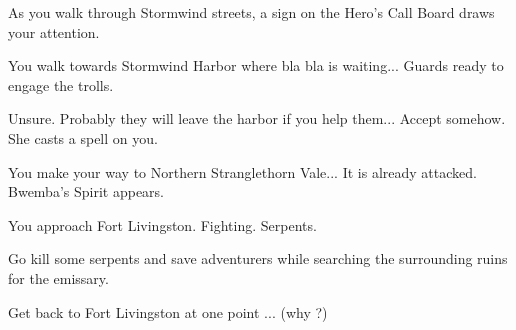 As you walk through Stormwind streets, a sign on the Hero's Call Board draws your attention.


You walk towards Stormwind Harbor where bla bla is waiting... Guards ready to engage the trolls.





Unsure. Probably they will leave the harbor if you help them... Accept somehow. She casts a spell on you.



You make your way to Northern Stranglethorn Vale... It is already attacked. Bwemba's Spirit appears.


You approach Fort Livingston. Fighting. Serpents.




Go kill some serpents and save adventurers while searching the surrounding ruins for the emissary.



Get back to Fort Livingston at one point ... (why ?)



